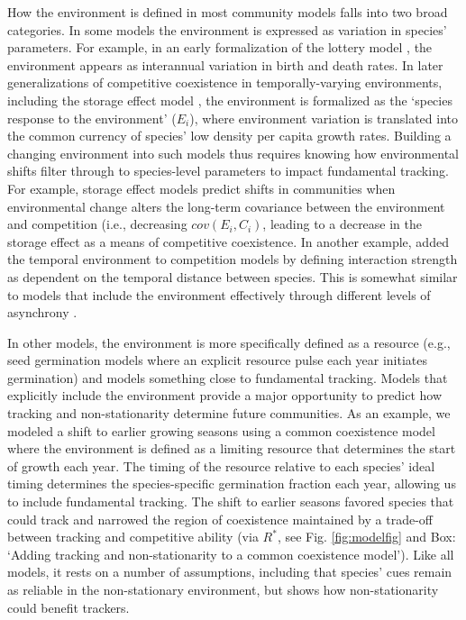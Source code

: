 \documentclass[11pt,letterpaper]{article}
\newcommand{\R}[1]{\label{}\linelabel{#1}} %
\begin{document}
How the environment is defined in most community models falls into two broad categories. In some models the environment is expressed as variation in species' parameters. For example, in an early formalization of the lottery model \citep{chesson1981}, the environment appears as interannual variation in birth and death rates.  In later generalizations of competitive coexistence in temporally-varying environments, including the storage effect model \citep{Chesson:1997dz}, the environment is formalized as the `species response to the environment' ($E_i$), where environment variation is translated into the common currency of species' low density per capita growth rates.  Building a changing environment into such models thus requires knowing how environmental shifts filter through to species-level parameters \citep{Tuljapurkar2009} to impact fundamental tracking. \R{r1dS}For example, storage effect models predict shifts in communities when environmental change alters the long-term covariance between the environment and competition (i.e., decreasing $cov(E_i, C_i)$, leading to a decrease in the storage effect as a means of competitive coexistence.\R{r1dE} In another example, \citet{volkerass} added the temporal environment to competition models by defining interaction strength as dependent on the temporal distance between species. This is somewhat similar to models that include \R{doublethe}the environment effectively through different levels of asynchrony \citep[e.g.,][]{Nakazawa2012,revilla2014}. 

In other models, the environment is more specifically defined as a resource (e.g., seed germination models where an explicit resource pulse each year initiates germination) and models something close to fundamental tracking. Models that explicitly include the environment provide a major opportunity to predict how tracking and non-stationarity determine future communities. \R{r1dS1}As an example, we modeled a shift to earlier growing seasons using a common coexistence model where the environment is defined as a limiting resource that determines the start of growth each year. The timing of the resource relative to each species' ideal timing determines the species-specific germination fraction each year, allowing us to include fundamental tracking. The shift to earlier seasons favored species that could track and narrowed the region of coexistence maintained by a trade-off between tracking and competitive ability (via $R^*$, see Fig. \ref{fig:modelfig} and Box: `Adding tracking and non-stationarity to a common coexistence model'). Like all models, it rests on a number of assumptions, including that species' cues remain as reliable in the non-stationary environment, but shows how non-stationarity could benefit trackers.\R{r1dE1} 
\end{document}
